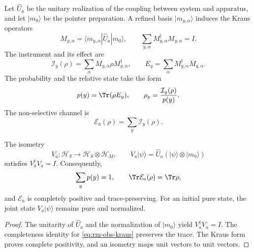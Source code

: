 Let \(\widehat U_a\) be the unitary realization of the coupling between
system and apparatus, and let \(|m_0\rangle\) be the pointer preparation. A
refined basis \(|m_{y,\alpha}\rangle\) induces the Kraus operators
\begin{equation}
 M_{y,\alpha}
 =\langle m_{y,\alpha}|\widehat U_a|m_0\rangle,
 \qquad
 \sum_{y,\alpha}M_{y,\alpha}^{\dagger}M_{y,\alpha}=I.
 \label{eq:rm-obs-kraus}
\end{equation}
The instrument and its effect are
\begin{equation}
 \mathcal I_y(\rho)
 =\sum_\alpha M_{y,\alpha}\rho M_{y,\alpha}^{\dagger},
 \qquad
 E_y=\sum_\alpha M_{y,\alpha}^{\dagger}M_{y,\alpha}.
 \label{eq:rm-obs-instrument}
\end{equation}
The probability and the relative state take the form
\begin{equation}
 p(y)=\Tr(\rho E_y),
 \qquad
 \rho_y=\frac{\mathcal I_y(\rho)}{p(y)}.
 \label{eq:rm-obs-general-conditioned-state}
\end{equation}
The non-selective channel is
\begin{equation}
 \mathcal E_a(\rho)=\sum_y\mathcal I_y(\rho).
 \label{eq:rm-obs-unconditioned-channel}
\end{equation}

\begin{proposition}
\label{prop:rm-obs-global-channel}
The isometry
\begin{equation}
 V_a:\mathcal H_S\longrightarrow\mathcal H_S\otimes\mathcal H_M,
 \qquad
 V_a|\psi\rangle=\widehat U_a(|\psi\rangle\otimes|m_0\rangle)
 \label{eq:rm-obs-stinespring-isometry}
\end{equation}
satisfies \(V_a^\dagger V_a=I\). Consequently,
\begin{equation}
 \sum_y p(y)=1,
 \qquad
 \Tr\mathcal E_a(\rho)=\Tr\rho,
 \label{eq:rm-obs-trace-preservation}
\end{equation}
and \(\mathcal E_a\) is completely positive and trace-preserving.
For an initial pure state, the joint state
\(V_a|\psi\rangle\) remains pure and normalized.
\end{proposition}

\begin{proof}
The unitarity of \(\widehat U_a\) and the normalization of
\(|m_0\rangle\) yield \(V_a^\dagger V_a=I\). The completeness identity for
\cref{eq:rm-obs-kraus} preserves the trace. The Kraus form proves
complete positivity, and an isometry maps unit vectors to
unit vectors.
\end{proof}

